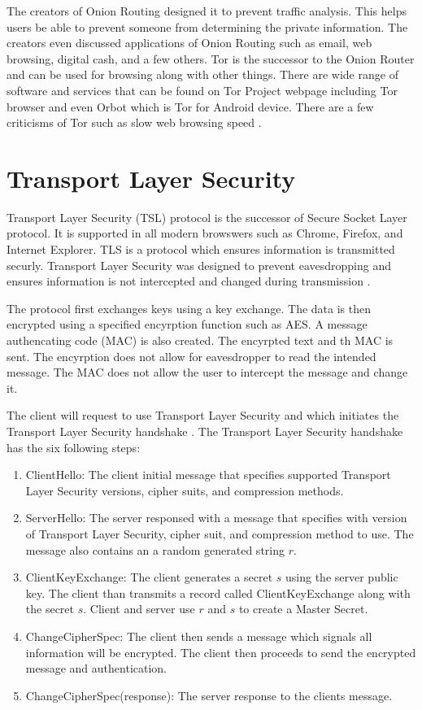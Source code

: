 \documentclass[12pt]{article}
\begin{document}
The creators of Onion Routing designed it to prevent traffic analysis. This helps users be able to prevent someone from determining the private information. The creators even discussed applications of Onion Routing such as email, web browsing, digital cash, and a few others\cite{Reed}. Tor is the successor to the Onion Router and can be used for browsing along with other things. There are wide range of software and services that can be found on Tor Project webpage including Tor browser and even Orbot which is Tor for Android device. There are a few criticisms of Tor such as slow web browsing speed \cite{GoldbertTwo}.

\section{Transport Layer Security}\label{sec:tls}

Transport Layer Security (TSL) protocol is the successor of Secure Socket Layer protocol. It is supported in all modern browswers such as Chrome, Firefox, and Internet Explorer. TLS is a protocol which ensures information is transmitted securly. Transport Layer Security was designed to prevent eavesdropping and ensures information is not intercepted and changed during transmission \cite{Sidhpurwala}.

The protocol first exchanges keys using a key exchange. The data is then encrypted using a specified encyrption function such as AES. A message authencating code (MAC) is also created. The encyrpted text and th MAC is sent. The encyrption does not allow for eavesdropper to read the intended message. The MAC does not allow the user to intercept the message and change it.

The client will request to use Transport Layer Security and which initiates the Transport Layer Security handshake \cite{Sidhpurwala}.  The Transport Layer Security handshake has the six following steps:
\begin{enumerate}
	\item ClientHello: The client initial message that specifies supported Transport Layer Security versions, cipher suits, and compression methods. 
	\item ServerHello: The server responsed with a message that specifies with version of Transport Layer Security, cipher suit, and compression method to use. The message also contains an a random generated string $r$.
	\item ClientKeyExchange: The client generates a secret $s$ using the server public key. The client than transmits a record called ClientKeyExchange along with the secret $s$. Client and server use $r$ and $s$ to create a Master Secret. 
	\item ChangeCipherSpec: The client then sends a message which signals all information will be encrypted. The client then proceeds to send the encrypted message and authentication. 
	\item ChangeCipherSpec(response): The server response to the clients message.
\end{enumerate}
\end{document}
